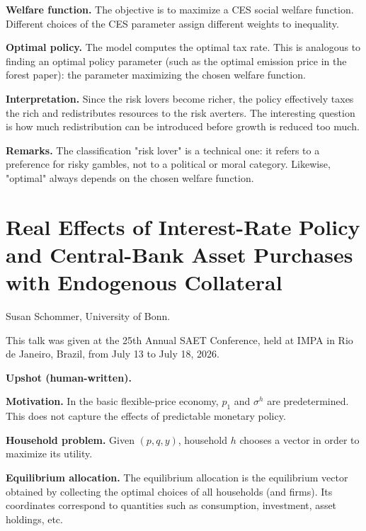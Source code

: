 \medskip\noindent
{\bf Welfare function.}
The objective is to maximize a CES
social welfare function. Different
choices of the CES parameter assign
different weights to inequality.

\medskip\noindent
{\bf Optimal policy.}
The model computes the optimal tax
rate. This is analogous to finding an
optimal policy parameter (such as the
optimal emission price in the forest
paper): the parameter maximizing the
chosen welfare function.

\medskip\noindent
{\bf Interpretation.}
Since the risk lovers become richer,
the policy effectively taxes the rich
and redistributes resources to the
risk averters. The interesting
question is how much redistribution
can be introduced before growth is
reduced too much.

\medskip\noindent
{\bf Remarks.}
The classification "risk lover" is a
technical one: it refers to a
preference for risky gambles, not to
a political or moral category.
Likewise, "optimal" always depends on
the chosen welfare function.


\section{Real Effects of Interest-Rate
Policy and Central-Bank Asset Purchases
with Endogenous Collateral}
\label{%
section-interest-rate-policy%
}

\medskip\noindent
Susan Schommer,
University of Bonn.

\medskip\noindent
This talk was given at the 25th Annual
SAET Conference, held at IMPA in Rio de
Janeiro, Brazil, from July 13 to
July 18, 2026.

\medskip\noindent
{\bf Upshot (human-written).}


\medskip\noindent
{\bf Motivation.}
In the basic flexible-price economy,
$p_1$ and $\sigma^h$ are
predetermined. This does not capture
the effects of predictable monetary
policy.

\medskip\noindent
{\bf Household problem.}
Given $(p,q,y)$, household $h$
chooses a vector in order to maximize
its utility.

\medskip\noindent
{\bf Equilibrium allocation.}
The equilibrium allocation is the
equilibrium vector obtained by
collecting the optimal choices of all
households (and firms). Its
coordinates correspond to quantities
such as consumption, investment,
asset holdings, etc.

